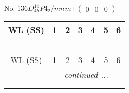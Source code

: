 \documentclass[fleqn,9pt,landscape]{jsarticle}
\begin{document}
\newpage
No. 136\quad$D_{4h}^{14}$\quad$P4_2/mnm$\quad[ tetragonal ]\quad$+\begin{pmatrix} 0 & 0 & 0 \end{pmatrix}$
\begin{center}
\renewcommand{\arraystretch}{1.2}
\begin{longtable}{ccccccc}
 \hline \hline
WL (SS) & 1 & 2 & 3 & 4 & 5 & 6 \\ \hline \endfirsthead

\multicolumn{6}{l}{\tablename\ \thetable{}} \\
 \hline \hline
WL (SS) & 1 & 2 & 3 & 4 & 5 & 6 \\ \hline \endhead

 \hline \hline
\multicolumn{6}{r}{\footnotesize\it continued ...} \\ \endfoot

 \hline \hline
\multicolumn{6}{r}{} \\ \endlastfoot


\end{longtable}
\end{center}
\end{document}
